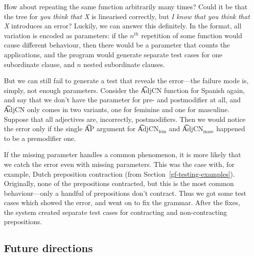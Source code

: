 How about repeating the same function arbitrarily many times? Could it
be that the tree for {\em you think that X} is linearised correctly,
but {\em I know that you think that X} introduces an error?  Luckily,
we can answer this definitely.  In the \pmcfg{} format, all variation
is encoded as parameters: if the $n^{th}$ repetition of some function
would cause different behaviour, then there would be a parameter that
counts the applications, and the program would generate separate test
cases for one subordinate clause, and $n$ nested subordinate clauses.

But we can still fail to generate a test that reveals the error---the
failure mode is, simply, not enough parameters.  Consider the
\t{AdjCN} function for Spanish again, and say that we don’t have the
parameter for pre- and postmodifier at all, and \t{AdjCN} only comes
in two variants, one for feminine and one for masculine. Suppose that
all adjectives are, incorrectly, postmodifiers. Then we would notice
the error only if the single \t{AP} argument for \t{AdjCN$_{\text{fem}}$} 
and \t{AdjCN$_{\text{masc}}$} happened to be a premodifier one.

If the missing parameter handles a common phenomenon, it is more
likely that we catch the error even with missing parameters. This was
the case with, for example, Dutch preposition contraction (from
Section~\ref{gf-testing-examples}). Originally, none of the
prepositions contracted, but this is the most common behaviour---only a
handful of prepositions don’t contract. Thus we got some test cases
which showed the error, and went on to fix the grammar. After the
fixes, the system created separate test cases for contracting and
non-contracting prepositions.

\subsection{Future directions}

